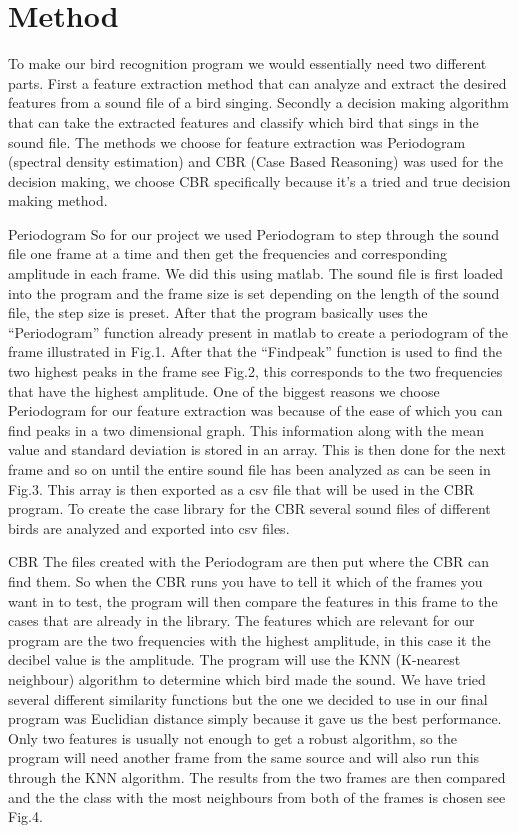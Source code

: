 \section{Method}
To make our bird recognition program we would essentially need two different parts. First a feature extraction method that can analyze and extract the desired features from a sound file of a bird singing. Secondly a decision making algorithm that can take the extracted features and classify which bird that sings in the sound file. The methods we choose for feature extraction was Periodogram (spectral density estimation) and CBR (Case Based Reasoning) was used for the decision making, we choose CBR specifically because it’s a tried and true decision making method. 

Periodogram
So for our project we used Periodogram to step through the sound file one frame at a time and then get the frequencies and corresponding amplitude in each frame. We did this using matlab. The sound file is first loaded into the program and the frame size is set depending on the length of the sound file, the step size is preset. After that the program basically uses the “Periodogram” function already present in matlab to create a periodogram of the frame illustrated in Fig.1. After that the “Findpeak” function is used to find the two highest peaks in the frame see Fig.2, this corresponds to the two frequencies that have the highest amplitude. One of the biggest reasons we choose Periodogram for our feature extraction was because of the ease of which you can find peaks in a two dimensional graph. This information along with the mean value and standard deviation is stored in an array. This is then done for the next frame and so on until the entire sound file has been analyzed as can be seen in Fig.3. This array is then exported as a csv file that will be used in the CBR program. To create the case library for the CBR several sound files of different birds are analyzed and exported into csv files.

CBR
The files created with the Periodogram are then put where the CBR can find them. So when the CBR runs you have to tell it which of the frames you want in to test, the program will then compare the features in this frame to the cases that are already in the library. The features which are relevant for our program are the two frequencies with the highest amplitude, in this case it the decibel value is the amplitude. The program will use the KNN (K-nearest neighbour) algorithm to determine which bird made the sound. We have tried several different similarity functions but the one we decided to use in our final program was Euclidian distance simply because it gave us the best performance. Only two features is usually not enough to get a robust algorithm, so the program will need another frame from the same source and will also run this through the KNN algorithm. The results from the two frames are then compared and the the class with the most neighbours from both of the frames is chosen see Fig.4.
